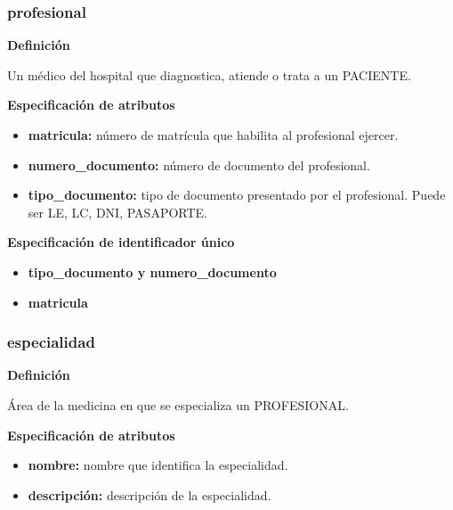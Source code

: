 \documentclass[a4paper,11pt]{article}
\begin{document}
\subsubsection{\textbf{profesional}}

\textbf{Definición}

Un médico del hospital que diagnostica, atiende o trata a un PACIENTE.

\textbf{Especificación de atributos}

\begin{itemize}

     \item \textbf{matricula:} número de matrícula que habilita al profesional ejercer.

     \item \textbf{numero\_documento:} número de documento del profesional.

     \item \textbf{tipo\_documento:} tipo de documento presentado por el profesional. Puede ser 
     LE, LC, DNI, PASAPORTE.

\end{itemize}

\textbf{Especificación de identificador único}

\begin{itemize}


    \item \textbf{tipo\_documento y numero\_documento}

    \item \textbf{matricula}

\end{itemize}

\subsubsection{\textbf{especialidad}}

\textbf{Definición}

Área de la medicina en que se especializa un PROFESIONAL.

\textbf{Especificación de atributos}

\begin{itemize}

     \item \textbf{nombre:} nombre que identifica la especialidad.

     \item \textbf{descripción:} descripción de la especialidad.

\end{itemize}
\end{document}
